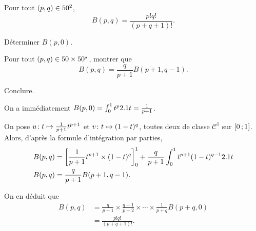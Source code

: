 \begin{theo}
Pour tout $(p,q) \in \N^2$,
    $$B(p, q) = \frac{p! q!}{(p + q + 1)!}.$$
\end{theo}


\begin{exercice}
\begin{questions}
\item Déterminer $B(p, 0)$.

\item Pour tout $(p, q) \in \N \times \Ne$, montrer que
\[
B(p, q) = \frac{q}{p + 1} B(p+1, q-1).
\]

\item Conclure.
\end{questions}
\end{exercice}

\begin{solution}
\begin{reponses}
\item On a immédiatement $B(p, 0) = \int_0^1 t^p \d t = \frac{1}{p + 1}$.

\item On pose $\fonctionligne[u]{t}{\frac{1}{p+1} t^{p+1}}$ et $\fonctionligne[v]{t}{(1-t)^q}$, toutes deux de classe $\mathscr{C}^1$ sur $\interff{0}{1}$. Alors, d'après la formule d'intégration par parties, 
\begin{align*}
B(p,q) &= \left[ \frac{1}{p+1}t^{p+1} \times (1-t)^q \right]_0^1 + \frac{q}{p+1} \int_0^1 t^{p+1} (1-t)^{q-1} \d t \\
B(p,q) &= \frac{q}{p+1} B(p+1, q-1).
\end{align*}

On en déduit que 
\begin{align*}
B(p, q)
&= \frac{q}{p+1} \times \frac{q-1}{p+2} \times \cdots \times \frac{1}{p+q} B(p+q, 0) \\
&= \frac{p! q!}{(p + q + 1)!}.
\end{align*}
\end{reponses}
\end{solution}

